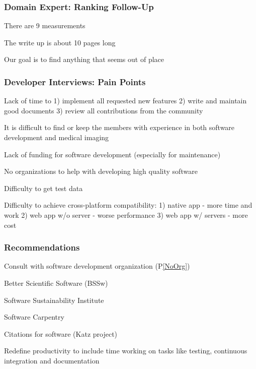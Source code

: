 \documentclass[t,12pt,numbers,fleqn]{beamer}
\begin{document}

\begin{frame}
\frametitle{Domain Expert: Ranking Follow-Up}

\bi
\item {}
\bi
\item There are 9 measurements
\item The write up is about 10 pages long
\item Our goal is to find anything that seems out of place
  \ei \ei

\end{frame}


\begin{frame}
\frametitle{Developer Interviews: Pain Points}

\be
\item Lack of time to 1) implement all requested new features 2) write and
  maintain good documents 3) review all contributions from the community
\item It is difficult to find or keep the members with experience in both
  software development and medical imaging
\item Lack of funding for software development (especially for maintenance)
\item No organizations to help with developing high quality software \label{NoOrg}
\item Difficulty to get test data
\item Difficulty to achieve cross-platform compatibility: 1) native app - more
  time and work 2) web app w/o server - worse performance 3) web app w/ servers
  - more cost \ee

\end{frame}


\begin{frame}
\frametitle{Recommendations}

\bi
\item Consult with software development organization (P\ref{NoOrg})
  \bi
\item Better Scientific Software (BSSw)
\item Software Sustainability Institute
\item Software Carpentry
  \ei
\item Citations for software (Katz project)
  \item Redefine productivity to include time working on tasks like testing, continuous
    integration and documentation
\ei

\end{frame}
\end{document}
